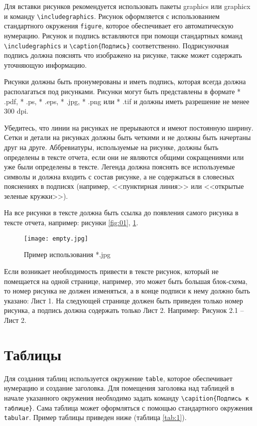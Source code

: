 Для вставки рисунков рекомендуется использовать пакеты graphics или graphicx и команду
\verb|\includegraphics|. Рисунок оформляется с использованием стандартного окружения \verb|figure|, которое обеспечивает его автоматическую нумерацию. Рисунок и подпись вставляются при помощи стандартных команд \verb|\includegraphics| и \verb|\caption{Подпись}| соответственно. Подрисуночная подпись должна пояснять что изображено на рисунке, также может содержать уточняющую информацию. 

Рисунки должны быть пронумерованы и иметь подпись, которая всегда должна располагаться 
под рисунками. Рисунки могут быть представлены в формате * .pdf, * .ps, * .eps, * .jpg, 
* .png или * .tif и должны иметь разрешение не менее 300 dpi. 

Убедитесь, что линии на рисунках не прерываются и имеют постоянную ширину. Сетки и детали
на рисунках должны быть четкими и не должны быть начертаны друг на друге. Аббревиатуры, 
используемые на рисунке, должны быть определены в тексте отчета, если они не являются общими сокращениями или уже были определены в тексте. Легенда должна пояснять все используемые символы и должна входить с состав рисунке, а не содержаться в словесных пояснениях в подписях (например, <<пунктирная линия>> или <<открытые зеленые кружки>>).

На все рисунки в тексте должна быть ссылка до появления самого рисунка в тексте отчета, например: рисунки \ref{fig:01}, \ref{fig:02}.


\begin{figure}[h!]
\begin{center}
\texttt{[image: empty.jpg]}\\[2mm]
\caption{Пример использования *.jpg}\label{fig:02}
\end{center}
\end{figure}

Если возникает необходимость привести в тексте рисунок, который не помещается на одной странице, например, это может быть большая блок-схема, то номер рисунка не должен изменяться, а в конце подписи к нему должно быть указано: Лист 1. На следующей странице должен быть приведен только номер рисунка, а подпись должна содержать только Лист 2.
Например: Рисунок 2.1 -- Лист 2.


\section{Таблицы}

Для создания таблиц используется окружение \verb|table|, которое обеспечивает 
нумерацию и создание заголовка. Для помещения заголовка над
таблицей в начале указанного окружения необходимо задать команду
\verb|\capition{Подпись к таблице}|. Сама таблица может оформляться с помощью стандартного окружения \verb|tabular|. Пример таблицы приведен ниже (таблица \ref{tab:1}). 

